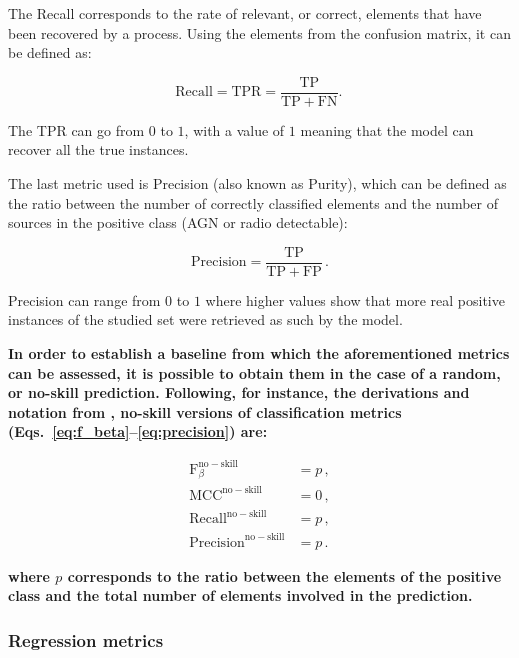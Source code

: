 \documentclass{aa}
\begin{document}
The Recall \citep[also called Completeness, Sensitivity, or True Positive Rate -TPR-;][]{10.2307/4586294} corresponds to the rate of relevant, or correct, elements that have been recovered by a process. Using the elements from the confusion matrix, it can be defined as:

\begin{equation}\label{eq:recall}
\mathrm{Recall} = \mathrm{TPR} = \frac{\mathrm{TP}}{\mathrm{TP} + \mathrm{FN}}.\,
\end{equation}

The TPR can go from $0$ to $1$, with a value of $1$ meaning that the model can recover all the true instances. 

The last metric used is Precision (also known as Purity), which can be defined as the ratio between the number of correctly classified elements and the number of sources in the positive class (AGN or radio detectable): 

\begin{equation}\label{eq:precision}
\mathrm{Precision} = \frac{\mathrm{TP}}{\mathrm{TP} + \mathrm{FP}}\,.
\end{equation}

Precision can range from $0$ to $1$ where higher values show that more real positive instances of the studied set were retrieved as such by the model.

\textbf{In order to establish a baseline from which the aforementioned metrics can be assessed, it is possible to obtain them in the case of a random, or no-skill prediction. Following, for instance, the derivations and notation from \citet{https://doi.org/10.1111/2041-210X.14071}, no-skill versions of classification metrics (Eqs.~\ref{eq:f_beta}--\ref{eq:precision}) are:}

\begin{align}
\mathrm{F}_{\beta}^{\mathrm{no{-}skill}} &= p\,,\label{eq:no_skill_Fb}\\
\mathrm{MCC}^{\mathrm{no{-}skill}} &= 0\,,\label{eq:no_skill_MCC}\\
\mathrm{Recall}^{\mathrm{no{-}skill}} &= p\,,\label{eq:no_skill_recall}\\
\mathrm{Precision}^{\mathrm{no{-}skill}} &= p\,.\label{eq:no_skill_precision}
\end{align}

\noindent \textbf{where $p$ corresponds to the ratio between the elements of the positive class and the total number of elements involved in the prediction.}

\subsubsection{Regression metrics}\label{sec:metrics_regression}
\end{document}
